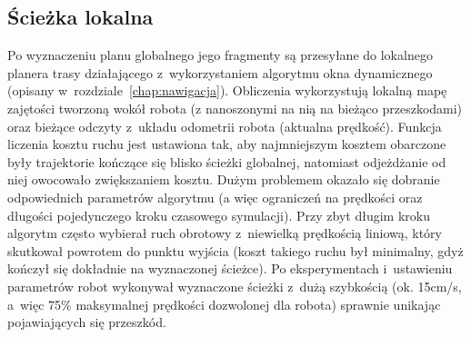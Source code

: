 \subsection{Ścieżka lokalna}

Po wyznaczeniu planu globalnego jego fragmenty są przesyłane do lokalnego planera
trasy działającego z~wykorzystaniem algorytmu okna dynamicznego (opisany 
w~rozdziale~\ref{chap:nawigacja}). Obliczenia wykorzystują lokalną mapę zajętości
tworzoną wokół robota (z nanoszonymi na nią na bieżąco przeszkodami) oraz
bieżące odczyty z~układu odometrii robota (aktualna prędkość).
Funkcja liczenia kosztu ruchu jest ustawiona tak,
aby najmniejszym kosztem obarczone były trajektorie kończące się blisko ścieżki globalnej,
natomiast odjeżdżanie od niej owocowało zwiększaniem kosztu. Dużym problemem okazało
się dobranie odpowiednich parametrów algorytmu (a więc ograniczeń na prędkości
oraz długości pojedynczego kroku czasowego symulacji). Przy zbyt długim kroku
algorytm często wybierał ruch obrotowy z~niewielką prędkością liniową, który skutkował
powrotem do punktu wyjścia (koszt takiego ruchu był minimalny, gdyż kończył się dokładnie
na wyznaczonej ścieżce). Po eksperymentach i~ustawieniu parametrów robot wykonywał
wyznaczone ścieżki z~dużą szybkością (ok. 15cm/s, a~więc 75\% maksymalnej prędkości
dozwolonej dla robota) sprawnie unikając pojawiających się przeszkód.

